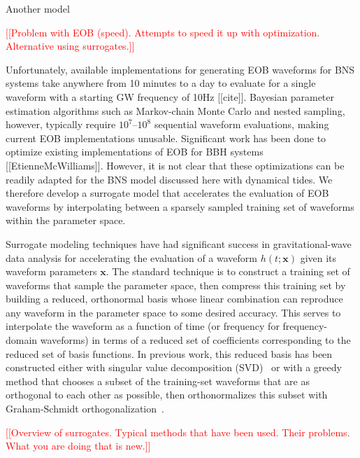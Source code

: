 \documentclass[prd,aps,letter,twocolumn,floatfix,notitlepage,nofootinbib]{revtex4-1}
\def\bx{\mathbf{x}}
\newcommand{\red}[1]{\textcolor{red}{#1}}
\begin{document}
Another model 


\red{[[Problem with EOB (speed). Attempts to speed it up with optimization. Alternative using surrogates.]]}

Unfortunately, available implementations for generating EOB waveforms for BNS systems take anywhere from 10 minutes to a day to evaluate for a single waveform with a starting GW frequency of 10Hz [[cite]]. Bayesian parameter estimation algorithms such as Markov-chain Monte Carlo and nested sampling, however, typically require $10^7$--$10^8$ sequential waveform evaluations, making current EOB implementations unusable. Significant work has been done to optimize existing implementations of EOB for BBH systems [[EtienneMcWilliams]]. However, it is not clear that these optimizations can be readily adapted for the BNS model discussed here with dynamical tides. We therefore develop a surrogate model that accelerates the evaluation of EOB waveforms by interpolating between a sparsely sampled training set of waveforms within the parameter space. 

Surrogate modeling techniques have had significant success in gravitational-wave data analysis for accelerating the evaluation of a waveform $h(t;\bx)$ given its waveform parameters $\bx$. The standard technique is to construct a training set of waveforms that sample the parameter space, then compress this training set by building a reduced, orthonormal basis whose linear combination can reproduce any waveform in the parameter space to some desired accuracy. This serves to interpolate the waveform as a function of time (or frequency for frequency-domain waveforms) in terms of a reduced set of coefficients corresponding to the reduced set of basis functions. In previous work, this reduced basis has been constructed either with singular value decomposition (SVD)~\cite{Puerrer2014, Puerrer2015} or with a greedy method that chooses a subset of the training-set waveforms that are as orthogonal to each other as possible, then orthonormalizes this subset with Graham-Schmidt orthogonalization~\cite{FieldGalleyHesthaven2014, LackeyBernuzziGalley2017, BlackmanFieldGalley2015, BlackmanFieldScheel2017a, BlackmanFieldScheel2017b}.

\red{[[Overview of surrogates. Typical methods that have been used. Their problems. What you are doing that is new.]]}
\end{document}
